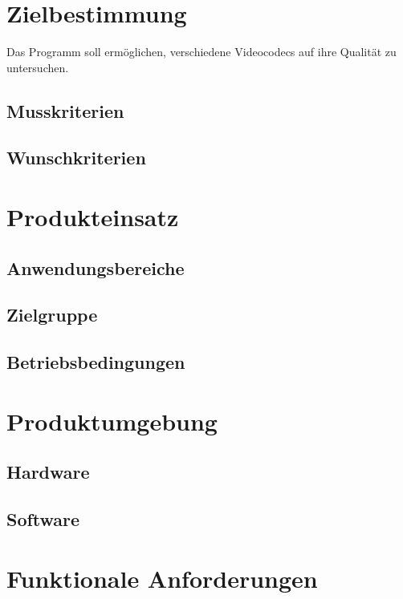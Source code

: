 \documentclass[parskip=full]{scrartcl}
\begin{document}
\maketitle
\thispagestyle{empty}
\newpage
\tableofcontents
\newpage
\section{Zielbestimmung}
Das Programm soll ermöglichen, verschiedene Videocodecs auf ihre Qualität zu untersuchen.
\subsection{Musskriterien}

\subsection{Wunschkriterien}

\section{Produkteinsatz}

\subsection{Anwendungsbereiche}

\subsection{Zielgruppe}

\subsection{Betriebsbedingungen}

\section{Produktumgebung}

\subsection{Hardware}

\subsection{Software}

\section{Funktionale Anforderungen}
\end{document}
